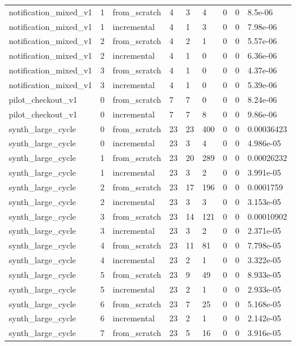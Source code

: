 \begin{table}[t]
\begin{tabular}{lllllllll}
notification\_mixed\_v1 & 1 & from\_scratch & 4 & 3 & 4 & 0 & 0 & 8.5e-06 \\
notification\_mixed\_v1 & 1 & incremental & 4 & 1 & 3 & 0 & 0 & 7.98e-06 \\
notification\_mixed\_v1 & 2 & from\_scratch & 4 & 2 & 1 & 0 & 0 & 5.57e-06 \\
notification\_mixed\_v1 & 2 & incremental & 4 & 1 & 0 & 0 & 0 & 6.36e-06 \\
notification\_mixed\_v1 & 3 & from\_scratch & 4 & 1 & 0 & 0 & 0 & 4.37e-06 \\
notification\_mixed\_v1 & 3 & incremental & 4 & 1 & 0 & 0 & 0 & 5.39e-06 \\
pilot\_checkout\_v1 & 0 & from\_scratch & 7 & 7 & 0 & 0 & 0 & 8.24e-06 \\
pilot\_checkout\_v1 & 0 & incremental & 7 & 7 & 8 & 0 & 0 & 9.86e-06 \\
synth\_large\_cycle & 0 & from\_scratch & 23 & 23 & 400 & 0 & 0 & 0.00036423 \\
synth\_large\_cycle & 0 & incremental & 23 & 3 & 4 & 0 & 0 & 4.986e-05 \\
synth\_large\_cycle & 1 & from\_scratch & 23 & 20 & 289 & 0 & 0 & 0.00026232 \\
synth\_large\_cycle & 1 & incremental & 23 & 3 & 2 & 0 & 0 & 3.991e-05 \\
synth\_large\_cycle & 2 & from\_scratch & 23 & 17 & 196 & 0 & 0 & 0.0001759 \\
synth\_large\_cycle & 2 & incremental & 23 & 3 & 3 & 0 & 0 & 3.153e-05 \\
synth\_large\_cycle & 3 & from\_scratch & 23 & 14 & 121 & 0 & 0 & 0.00010902 \\
synth\_large\_cycle & 3 & incremental & 23 & 3 & 2 & 0 & 0 & 2.371e-05 \\
synth\_large\_cycle & 4 & from\_scratch & 23 & 11 & 81 & 0 & 0 & 7.798e-05 \\
synth\_large\_cycle & 4 & incremental & 23 & 2 & 1 & 0 & 0 & 3.322e-05 \\
synth\_large\_cycle & 5 & from\_scratch & 23 & 9 & 49 & 0 & 0 & 8.933e-05 \\
synth\_large\_cycle & 5 & incremental & 23 & 2 & 1 & 0 & 0 & 2.933e-05 \\
synth\_large\_cycle & 6 & from\_scratch & 23 & 7 & 25 & 0 & 0 & 5.168e-05 \\
synth\_large\_cycle & 6 & incremental & 23 & 2 & 1 & 0 & 0 & 2.142e-05 \\
synth\_large\_cycle & 7 & from\_scratch & 23 & 5 & 16 & 0 & 0 & 3.916e-05 \\

\end{tabular}
\end{table}
